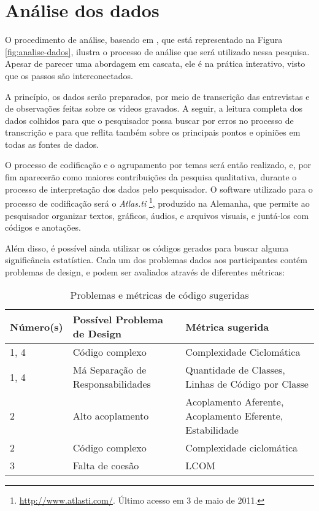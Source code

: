 \section{Análise dos dados}
\label{sec:planejamento-analise}

O procedimento de análise, baseado em \cite{creswell}, que está representado na
Figura \ref{fig:analise-dados}, ilustra o processo de análise que será utilizado
nessa pesquisa. Apesar de parecer uma abordagem em cascata, ele é na prática 
interativo, visto que os passos são interconectados. 

A princípio, os dados serão preparados, por meio de transcrição das
entrevistas e de observações feitas sobre os vídeos gravados. 
A seguir, a leitura completa dos
dados colhidos para que o pesquisador possa buscar por erros no processo de
transcrição e para que reflita também sobre os principais pontos e opiniões em
todas as fontes de dados.

O processo de codificação e o agrupamento
por temas será então realizado, e, por fim aparecerão como maiores
contribuições da pesquisa qualitativa, durante o processo de interpretação dos
dados pelo pesquisador. O software utilizado para o processo de codificação será
o \textit{Atlas.ti} \footnote{\url{http://www.atlasti.com/}. Último acesso em 3
de maio de 2011.}, produzido na Alemanha, que permite ao pesquisador organizar textos,
gráficos, áudios, e arquivos visuais, e juntá-los com códigos e anotações. 

Além disso, é possível ainda utilizar os códigos gerados para buscar alguma significância
estatística. Cada um dos problemas dados aos participantes contém problemas de design, e
podem ser avaliados através de diferentes métricas:

\begin{table}[h!]
	\begin{tabular}{ | p{2cm} | p{7cm} | p{6cm} | }
		Número(s) & Possível Problema de Design & Métrica sugerida \\ \hline
		1, 4 & Código complexo & Complexidade Ciclomática \\ \hline
		1, 4 & Má Separação de Responsabilidades & Quantidade de Classes, Linhas de Código por Classe \\
		
		\hline
		
		2 & Alto acoplamento & Acoplamento Aferente, Acoplamento Eferente, Estabilidade \\ \hline
		2 & Código complexo & Complexidade ciclomática \\
		
		\hline
		
		3 & Falta de coesão & LCOM \\
		
		\hline
		
	\end{tabular}
	\caption{Problemas e métricas de código sugeridas}
\end{table}

